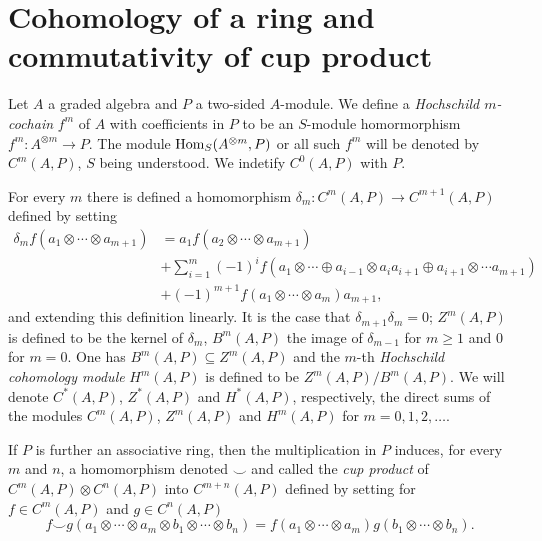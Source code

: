 \documentclass[TFM.tex]{subfiles}
\begin{document}
\section{Cohomology of a ring and commutativity of cup product}

\begin{defi}Let $A$ a graded algebra and $P$ a two-sided $A$-module. We define a \emph{Hochschild $m$-cochain} $f^m$ of $A$ with coefficients in $P$ to be an $S$-module homormorphism $f^m: A^{\otimes m}\to P$. The module $\operatorname{Hom}_S(A^{\otimes m}, P)$ or all such $f^m$ will be denoted by $C^m(A,P)$, $S$ being understood. We indetify $C^0(A,P)$ with $P$.
\end{defi}

For every $m$ there is defined a homomorphism $\delta_m: C^m(A,P)\to C^{m+1}(A,P)$ defined by setting
\begin{align*}
\delta_m f(a_1\otimes\cdots\otimes a_{m+1})&=a_1f(a_2\otimes\cdots\otimes a_{m+1})\\
& +\sum_{i=1}^m(-1)^if(a_1\otimes\cdots\oplus a_{i-1}\otimes a_ia_{i+1}\oplus a_{i+1}\otimes\cdots a_{m+1})\\
& +(-1)^{m+1}f(a_1\otimes\cdots\otimes a_m)a_{m+1},
\end{align*}
and extending this definition linearly. It is the case that $\delta_{m+1}\delta_m=0$; $Z^m(A,P)$ is defined to be the kernel of $\delta_m$, $B^m(A,P)$ the image of $\delta_{m-1}$ for $m\geq 1$ and 0 for $m=0$. One has $B^m(A,P)\subseteq Z^m(A,P)$ and the $m$-th \emph{Hochschild cohomology module} $H^m(A,P)$ is defined to be $Z^m(A,P)/B^m(A,P)$. We will denote $C^*(A,P)$, $Z^*(A,P)$ and $H^*(A,P)$, respectively, the direct sums of the modules $C^m(A,P)$, $Z^m(A,P)$ and $H^m(A,P)$ for $m=0,1,2,\dots$. 

If $P$ is further an associative ring, then the multiplication in $P$ induces, for every $m$ and $n$, a homomorphism denoted $\smile$ and called the \emph{cup product} of $C^m(A,P)\otimes C^n(A,P)$ into $C^{m+n}(A,P)$ defined by setting for $f\in C^m(A,P)$ and $g\in C^n(A,P)$
\[
f\smile g(a_1\otimes\cdots\otimes a_m\otimes b_1\otimes\cdots\otimes b_n)=f(a_1\otimes\cdots\otimes a_m)g(b_1\otimes\cdots\otimes b_n).
\]
\end{document}
